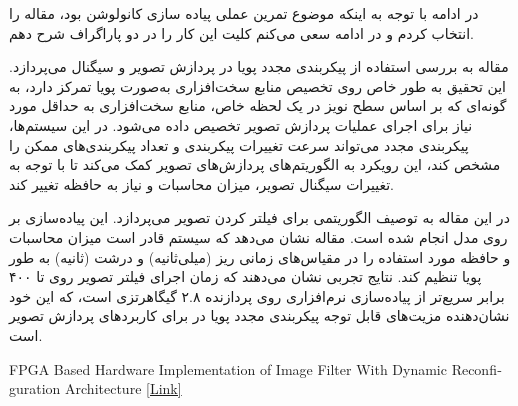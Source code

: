 \begin{qsolve}
	در ادامه با توجه به اینکه موضوع تمرین عملی پیاده سازی کانولوشن بود، مقاله \cite{ref1} را انتخاب کردم و در ادامه سعی می‌کنم کلیت این کار را در دو پاراگراف شرح دهم.
	
	
	مقاله به بررسی استفاده از پیکربندی مجدد پویا در پردازش تصویر و سیگنال می‌پردازد. این تحقیق به طور خاص روی تخصیص منابع سخت‌افزاری به‌صورت پویا تمرکز دارد، به گونه‌ای که بر اساس سطح نویز در یک لحظه خاص، منابع سخت‌افزاری به حداقل مورد نیاز برای اجرای عملیات پردازش تصویر تخصیص داده می‌شود. در این سیستم‌ها، پیکربندی مجدد می‌تواند سرعت تغییرات پیکربندی و تعداد پیکربندی‌های ممکن را مشخص کند، این رویکرد به الگوریتم‌های پردازش‌های تصویر کمک می‌کند تا با توجه به تغییرات سیگنال تصویر، میزان محاسبات و نیاز به حافظه تغییر کند.
	
	
	در این مقاله به توصیف الگوریتمی برای فیلتر کردن تصویر می‌پردازد. این پیاده‌سازی بر روی  مدل  انجام شده است. مقاله نشان می‌دهد که سیستم قادر است میزان محاسبات و حافظه مورد استفاده را در مقیاس‌های زمانی ریز (میلی‌ثانیه) و درشت (ثانیه) به طور پویا تنظیم کند. نتایج تجربی نشان می‌دهند که زمان اجرای فیلتر تصویر روی  تا ۴۰۰ برابر سریع‌تر از پیاده‌سازی نرم‌افزاری روی پردازنده ۲.۸ گیگاهرتزی  است، که این خود نشان‌دهنده مزیت‌های قابل توجه پیکربندی مجدد پویا در  برای کاربردهای پردازش تصویر است.
	
	
\end{qsolve}





\begin{latin}
	\begin{thebibliography}{9}
		FPGA Based Hardware Implementation of Image Filter With Dynamic Reconfiguration Architecture \href{https://citeseerx.ist.psu.edu/document?repid=rep1&type=pdf&doi=e064fe8a4e6a3808ee5cc6f53d13be94a3671fc4}{[Link]}
	\end{thebibliography} 
\end{latin}